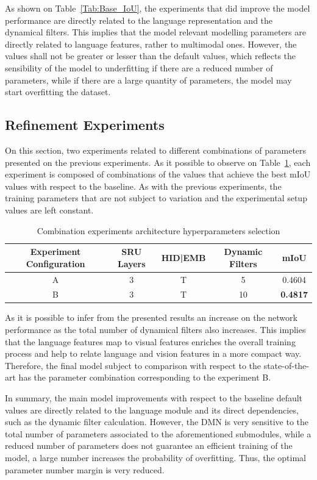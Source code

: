 As shown on Table~\ref{Tab:Base_IoU}, the experiments that did improve the model performance are directly related to the language representation and the dynamical filters. This implies that the model relevant modelling parameters are directly related to language features, rather to multimodal ones. However, the values shall not be greater or lesser than the default values, which reflects the sensibility of the model to underfitting if there are a reduced number of parameters, while if there are a large quantity of parameters, the model may start overfitting the dataset.

\subsection{Refinement Experiments}
\label{section:refinement}
On this section, two experiments related to different combinations of parameters presented on the previous experiments. As it possible to observe on Table~\ref{Tab:Comb_Exp}, each experiment is composed of combinations of the values that achieve the best mIoU values with respect to the baseline. As with the previous experiments, the training parameters that are not subject to variation and the experimental setup values are left constant.

\begin{table}[!htbp]
    \centering
    \begin{tabular}{|c|c|c|c|c|}
        \hline
        Experiment Configuration & SRU Layers & HID|EMB & Dynamic Filters & mIoU  \\
        \hline
        A & 3 & T & 5 & 0.4604 \\
        \hline
        B & 3 & T & 10 & \textbf{0.4817} \\
        \hline
    \end{tabular}
    \caption{Combination experiments architecture hyperparameters selection}
    \label{Tab:Comb_Exp}
\end{table}

As it is possible to infer from the presented results an increase on the network performance as the total number of dynamical filters also increases. This implies that the language features map to visual features enriches the overall training process and help to relate language and vision features in a more compact way. Therefore, the final model subject to comparison with respect to the state-of-the-art has the parameter combination corresponding to the experiment B.

In summary, the main model improvements with respect to the baseline default values are directly related to the language module and its direct dependencies, such as the dynamic filter calculation. However, the DMN is very sensitive to the total number of parameters associated to the aforementioned submodules, while a reduced number of parameters does not guarantee an efficient training of the model, a large number increases the probability of overfitting. Thus, the optimal parameter number margin is very reduced. 

